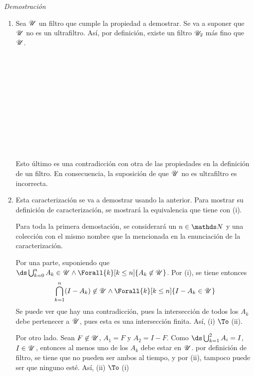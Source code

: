 \documentclass{article}
\theoremstyle{definition}
\theoremstyle{theorem*}
\begin{document}
\begin{proofbox}[10]{\textit{Demostración}}
  \begin{enumerate}
    \item Sea $\mathscr{U}$ un filtro que cumple la propiedad a demostrar.
          Se va a suponer que $\mathscr{U}$ no es un ultrafiltro. Así, por
          definición, existe un filtro $\mathscr{U}_2$ más fino que $\mathscr{U}$.
            \begin{longderivation}
                \\
              \equiv\\
                \\
              \\
                \\
              \\
                \\
              \equiv\\
                \\
              \\
            \end{longderivation}
          Esto último es una contradicción con otra de las propiedades en la definición
          de un filtro. En consecuencia, la suposición de que $\mathscr{U}$ no es ultrafiltro es
          incorrecta.
    \item Esta caracterización se va a demostrar usando la anterior. Para mostrar
          su definición de caracterización, se mostrará la equivalencia que tiene con (i).

          Para toda la primera demostación, se considerará un $n \in \N$ y una colección con el
          mismo nombre que la mencionada en la enunciación de la caracterización.
          
          Por una parte, suponiendo que $\ds\bigcup_{k=0}^n A_k \in \U \land
          \Forall{k}[k\leq n]{A_k \not\in \U}$. Por (i), se tiene entonces
          \[\bigcap_{k=1}^n (I-A_k) \not\in \U \land \Forall{k}[k\leq n]{I - A_k \in \U}\]
          Se puede ver que hay una contradicción, pues la intersección de todos los $A_k$
          debe pertenecer a $\mathscr{U}$, pues esta es una intersección finita. Así, (i) $\To$ (ii).

          Por otro lado. Sean $F \not\in \mathscr{U}$, $A_1 = F$ y $A_2 = I-F$. Como
          $\ds\bigcup_{k=1}^{2} A_i = I$, $I \in \mathscr{U}$, entonces al menos uno de los
          $A_k$ debe estar en $\mathscr{U}$. por definición de filtro, se tiene que no pueden ser
          ambos al tiempo, y por (ii), tampoco puede ser que ninguno esté. Así, (ii) $\To$ (i)
  \end{enumerate}
\end{proofbox}
\end{document}
